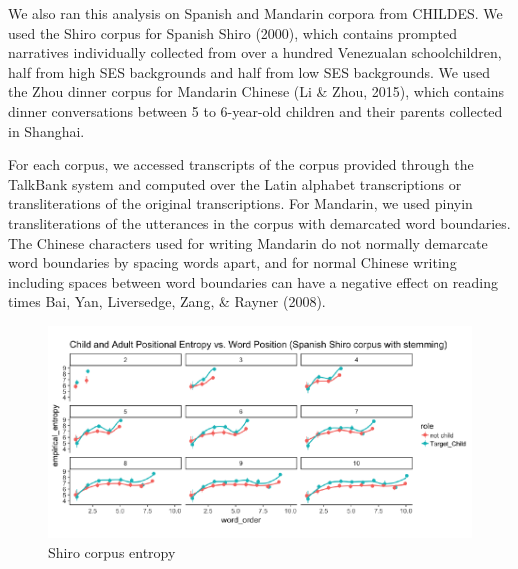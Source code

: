 \documentclass[10pt, letterpaper]{article}
\newenvironment{CodeChunk}{}{}
\begin{document}
We also ran this analysis on Spanish and Mandarin corpora from CHILDES.
We used the Shiro corpus for Spanish Shiro (2000), which contains
prompted narratives individually collected from over a hundred
Venezualan schoolchildren, half from high SES backgrounds and half from
low SES backgrounds. We used the Zhou dinner corpus for Mandarin Chinese
(Li \& Zhou, 2015), which contains dinner conversations between 5 to
6-year-old children and their parents collected in Shanghai.

For each corpus, we accessed transcripts of the corpus provided through
the TalkBank system and computed over the Latin alphabet transcriptions
or transliterations of the original transcriptions. For Mandarin, we
used pinyin transliterations of the utterances in the corpus with
demarcated word boundaries. The Chinese characters used for writing
Mandarin do not normally demarcate word boundaries by spacing words
apart, and for normal Chinese writing including spaces between word
boundaries can have a negative effect on reading times Bai, Yan,
Liversedge, Zang, \& Rayner (2008).

\begin{CodeChunk}
\begin{figure}[h]

{\centering \includegraphics{figs/shiro_PE-1} 

}

\caption[Shiro corpus entropy]{Shiro corpus entropy}\label{fig:shiro_PE}
\end{figure}
\end{CodeChunk}
\end{document}
